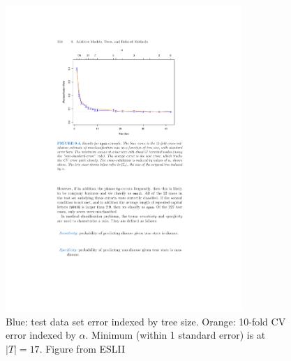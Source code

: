 \documentclass[mathserif, aspectratio=169]{beamer}
\begin{document}
\begin{frame}{}
\begin{figure}
\includegraphics[width=0.8\textwidth]{spam_error}
\caption*{Blue: test data set error indexed by tree size.  Orange: 10-fold CV error indexed by $\alpha$.  Minimum (within 1 standard error) is at $|T|=17$.  Figure from ESLII}
\end{figure}
\end{frame}
\end{document}

